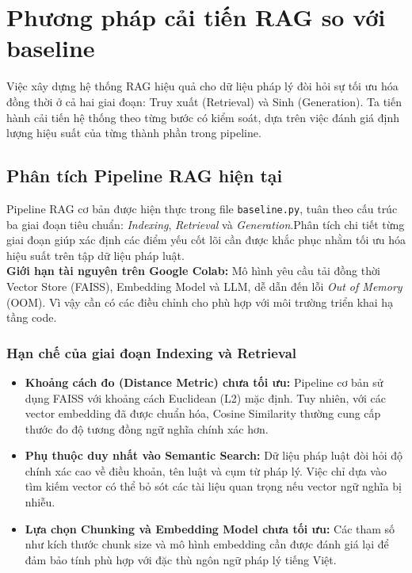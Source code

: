 \section{Phương pháp cải tiến RAG so với baseline}

Việc xây dựng hệ thống RAG hiệu quả cho dữ liệu pháp lý đòi hỏi sự tối ưu hóa đồng thời ở cả hai giai đoạn: Truy xuất (Retrieval) và Sinh (Generation). Ta tiến hành cải tiến hệ thống theo từng bước có kiểm soát, dựa trên việc đánh giá định lượng hiệu suất của từng thành phần trong pipeline.

\subsection{Phân tích Pipeline RAG hiện tại}

Pipeline RAG cơ bản được hiện thực trong file \texttt{baseline.py}, tuân theo cấu trúc ba giai đoạn tiêu chuẩn: \textit{Indexing}, \textit{Retrieval} và \textit{Generation}.Phân tích chi tiết từng giai đoạn giúp xác định
các điểm yếu cốt lõi cần được khắc phục nhằm tối ưu hóa hiệu suất trên tập dữ liệu pháp luật.\\
\textbf{Giới hạn tài nguyên trên Google Colab:} Mô hình yêu cầu tải đồng thời Vector Store (FAISS), Embedding Model và LLM, dễ dẫn đến lỗi \textit{Out of Memory} (OOM). Vì vậy cần có các điều chỉnh cho phù hợp với môi trường triển khai hạ tầng code.

\subsubsection{Hạn chế của giai đoạn Indexing và Retrieval}

\begin{itemize}
  \item \textbf{Khoảng cách đo (Distance Metric) chưa tối ưu:} Pipeline cơ bản sử dụng FAISS với khoảng cách Euclidean (L2) mặc định. Tuy nhiên, với các vector embedding đã được chuẩn hóa, Cosine Similarity thường cung cấp thước đo độ tương đồng ngữ nghĩa chính xác hơn.

  \item \textbf{Phụ thuộc duy nhất vào Semantic Search:} Dữ liệu pháp luật đòi hỏi độ chính xác cao về điều khoản, tên luật và cụm từ pháp lý. Việc chỉ dựa vào tìm kiếm vector có thể bỏ sót các tài liệu quan trọng nếu vector ngữ nghĩa bị nhiễu.

  \item \textbf{Lựa chọn Chunking và Embedding Model chưa tối ưu:} Các tham số như kích thước chunk size và mô hình embedding cần được đánh giá lại để đảm bảo tính phù hợp với đặc thù ngôn ngữ pháp lý tiếng Việt.
\end{itemize}

